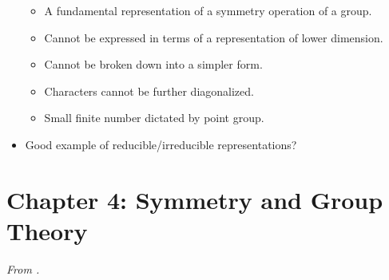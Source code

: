 \documentclass[../main.tex]{subfiles}
\begin{document}
\begin{itemize}
    \begin{itemize}
        \item A fundamental representation of a symmetry operation of a group.
        \item Cannot be expressed in terms of a representation of lower dimension.
        \item Cannot be broken down into a simpler form.
        \item Characters cannot be further diagonalized.
        \item Small finite number dictated by point group.
    \end{itemize}
    \item Good example of reducible/irreducible representations?
\end{itemize}



\section{Chapter 4: Symmetry and Group Theory}
\emph{From \textcite{bib:MiesslerFischerTarr}.}
\end{document}
